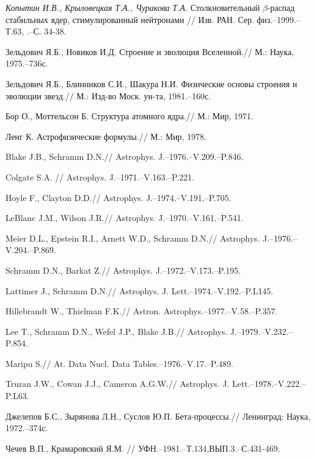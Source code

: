 \begin{thebibliography}{200}
\textit{Копытин И.В., Крыловецкая Т.А., Чуракова Т.А.} Столкновительный
$\beta$-распад стабильных ядер, стимулированный нейтронами // Изв. РАН.
Сер. физ.--1999.--Т.63, .--С. 34-38.

Зельдович Я.Б., Новиков И.Д. Строение и эволюция Вселенной.// М.: Наука, 1975.--736с.


Зельдович Я.Б., Блинников С.И., Шакура Н.И. Физические основы строения и эволюции звезд.//
М.: Изд-во Моск. ун-та, 1981.--160с.


Бор О., Моттельсон Б. Структура атомного ядра.// М.: Мир, 1971.



Ленг К. Астрофизические формулы.// М.: Мир, 1978.



Blake J.B., Schramm D.N.// Astrophys. J.--1976.--V.209.--P.846.

Colgate S.A. // Astrophys. J.--1971.--V.163.--P.221.

Hoyle F., Clayton D.D.// Astrophys. J.--1974.--V.191.--P.705.

LeBlanc J.M., Wilson J.R.// Astrophys. J.--1970.--V.161.--P.541.

Meier D.L., Epstein R.I., Arnett W.D., Schramm D.N.//  Astrophys. J.--1976.--V.204.--P.869.

Schramm D.N., Barkat Z.//  Astrophys. J.--1972.--V.173.--P.195.

Lattimer J., Schramm D.N.// Astrophys. J. Lett.--1974.--V.192.--P.L145.

Hillebrandt W., Thielman F.K.// Astron. Astrophys.--1977.--V.58.--P.357.

Lee T., Schramm D.N., Wefel J.P., Blake J.B.//  Astrophys. J.--1979.--V.232.--P.854.

Maripu S.// At. Data Nucl. Data Tables.--1976.--V.17.--P.489.

Truran J.W., Cowan J.J., Cameron A.G.W.// Astrophys. J. Lett.--1978.--V.222.--P.L63.

Джелепов Б.С., Зырянова Л.Н., Суслов Ю.П. Бета-процессы.//
Ленинград: Наука, 1972.--374с.


Чечев В.П., Крамаровский Я.М. // УФН.--1981.--Т.134,ВЫП.3.--С.431-469.


\end{thebibliography}
